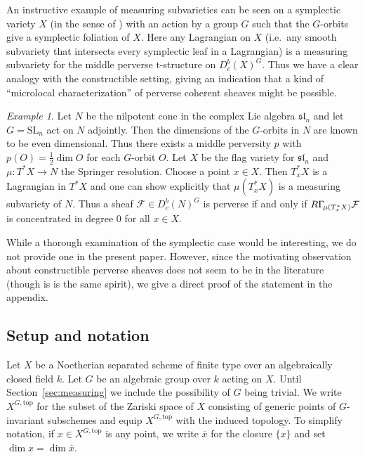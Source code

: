 \documentclass{compositio}
\theoremstyle{plain}
\theoremstyle{definition}
\theoremstyle{remark}
\newtheorem{Ex}[Thm]{Example}
\newcommand\sheaf{\mathcal}
\newcommand\liesl[1]{\mathfrak{sl}_#1}
\newcommand\SL[1]{\mathrm{SL}_#1}
\newcommand\lc[1]{\Gamma_{\mkern-3mu#1}}
\newcommand\Xtop[1][X]{#1^{G,\mathrm{top}}}
\begin{document}
An instructive example of measuring subvarieties can be seen on a symplectic variety $X$ (in the sense of \cite{Beauville:2000:SymplecticSingularities}) with an action by a group $G$ such that the $G$-orbits give a symplectic foliation of $X$.
Here any Lagrangian on $X$ (i.e.\ any smooth subvariety that intersects every symplectic leaf in a Lagrangian) is a measuring subvariety for the middle perverse t-structure on $D_c^b(X)^G$.
Thus we have a clear analogy with the constructible setting, giving an indication that a kind of \enquote{microlocal characterization} of perverse coherent sheaves might be possible.

\begin{Ex}
    Let $N$ be the nilpotent cone in the complex Lie algebra $\liesl n$ and let $G = \SL n$ act on $N$ adjointly.
    Then the dimensions of the $G$-orbits in $N$ are known to be even dimensional.
    Thus there exists a middle perversity $p$ with $p(O) = \frac12 \dim O$ for each $G$-orbit $O$.
    Let $X$ be the flag variety for $\liesl n$ and $\mu \colon T^*X \to  N$ the Springer resolution.
    Choose a point $x \in  X$.
    Then $T_x^*X$ is a Lagrangian in $T^*X$ and one can show explicitly that $\mu (T_x^*X)$ is a measuring subvariety of $N$.
    Thus a sheaf $\sheaf F \in  D_c^b(N)^G$ is perverse if and only if $R\lc{\mu (T_x^*X)}\sheaf F$ is concentrated in degree $0$ for all $x \in  X$.
\end{Ex}

While a thorough examination of the symplectic case would be interesting, we do not provide one in the present paper.
However, since the motivating observation about constructible perverse sheaves does not seem to be in the literature (though \cite[Theorem~3.5]{MirkovicVilonen:2007:GLdualityRepresentations} is is the same spirit), we give a direct proof of the statement in the appendix.

\subsection{Setup and notation}

Let $X$ be a Noetherian separated scheme of finite type over an algebraically closed field $k$.
Let $G$ be an algebraic group over $k$ acting on $X$.
Until Section~\ref{sec:measuring} we include the possibility of $G$ being trivial.
We write $\Xtop$ for the subset of the Zariski space of $X$ consisting of generic points of $G$-invariant subschemes and equip $\Xtop$ with the induced topology.
To simplify notation, if $x \in  \Xtop$ is any point, we write $\overline x$ for the closure $\overline{\{x\}}$ and set $\dim x = \dim \overline x$.
\end{document}
